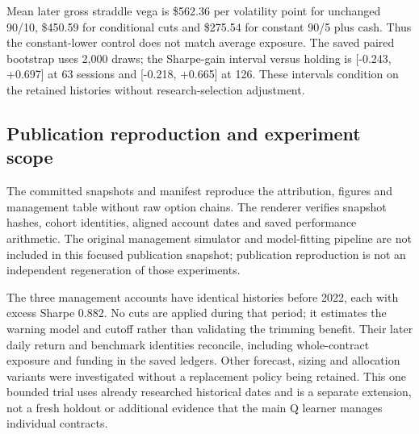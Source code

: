Mean later gross straddle vega is \$562.36 per volatility point for unchanged 90/10, \$450.59 for conditional cuts and \$275.54 for constant 90/5 plus cash. Thus the constant-lower control does not match average exposure. The saved paired bootstrap uses 2,000 draws; the Sharpe-gain interval versus holding is [-0.243, +0.697] at 63 sessions and [-0.218, +0.665] at 126. These intervals condition on the retained histories without research-selection adjustment.


\subsection*{Publication reproduction and experiment scope}

The committed  snapshots and manifest reproduce the attribution, figures and management table without raw option chains. The renderer verifies snapshot hashes, cohort identities, aligned account dates and saved performance arithmetic. The original management simulator and model-fitting pipeline are not included in this focused publication snapshot; publication reproduction is not an independent regeneration of those experiments.


The three management accounts have identical histories before 2022, each with excess Sharpe 0.882. No cuts are applied during that period; it estimates the warning model and cutoff rather than validating the trimming benefit. Their later daily return and benchmark identities reconcile, including whole-contract exposure and funding in the saved ledgers. Other forecast, sizing and allocation variants were investigated without a replacement policy being retained. This one bounded trial uses already researched historical dates and is a separate extension, not a fresh holdout or additional evidence that the main Q learner manages individual contracts.


\FloatBarrier
